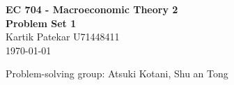 \documentclass[11pt]{article}
\newcommand{\hmwkTitle}{Problem Set 1}
\newcommand{\hmwkDueDate}{\today}
\newcommand{\hmwkClass}{EC 704 - Macroeconomic Theory 2}
\newcommand{\hmwkAuthorName}{Kartik Patekar U71448411}
\begin{document}
\setlength{\parindent}{0pt}

\begin{center}
  \textbf{\Large \hmwkClass}\\
  \textbf{\hmwkTitle}\\
  \hmwkAuthorName \\
  \hmwkDueDate
\end{center}

Problem-solving group: Atsuki Kotani, Shu an Tong



\pagebreak
{}



\pagebreak
{}



\end{document}
